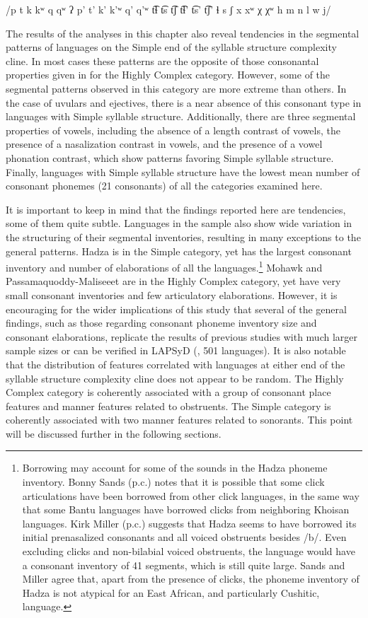 /p t k kʷ q qʷ ʔ p’ t’ k’ k’ʷ q’ q’ʷ t͡ɬ t͡s t͡ʃ t͡ɬ’ t͡s’ t͡ʃ’ ɬ s ʃ x xʷ χ χʷ h m n l w j/
\z

  The results of the analyses in this chapter also reveal tendencies in the segmental patterns of languages on the Simple end of the syllable structure complexity cline. In most cases these patterns are the opposite of those consonantal properties given in  for the Highly Complex category. However, some of the segmental patterns observed in this category are more extreme than others. In the case of uvulars and ejectives, there is a near absence of this consonant type in languages with Simple syllable structure. Additionally, there are three segmental properties of vowels, including the absence of a length contrast of vowels, the presence of a nasalization contrast in vowels, and the presence of a vowel phonation contrast, which show patterns favoring Simple syllable structure. Finally, languages with Simple syllable structure have the lowest mean number of consonant phonemes (21 consonants) of all the categories examined here.

  It is important to keep in mind that the findings reported here are tendencies, some of them quite subtle. Languages in the sample also show wide variation in the structuring of their segmental inventories, resulting in many exceptions to the general patterns. Hadza is in the Simple category, yet has the largest consonant inventory and number of elaborations of all the languages.\footnote{{Borrowing may account for some of the sounds in the Hadza phoneme inventory. Bonny Sands (p.c.) notes that it is possible that some click articulations have been borrowed from other click languages, in the same way that some Bantu languages have borrowed clicks from neighboring Khoisan languages. Kirk Miller (p.c.) suggests that Hadza seems to have borrowed its initial prenasalized consonants and all voiced obstruents besides /b/. Even excluding clicks and non-bilabial voiced obstruents, the language would have a consonant inventory of 41 segments, which is still quite large. Sands and Miller agree that, apart from the presence of clicks, the phoneme inventory of Hadza is not atypical for an East African, and particularly Cushitic, language.}} Mohawk and Passamaquoddy-Maliseeet are in the Highly Complex category, yet have very small consonant inventories and few articulatory elaborations. However, it is encouraging for the wider implications of this study that several of the general findings, such as those regarding consonant phoneme inventory size and consonant elaborations, replicate the results of previous studies with much larger sample sizes or can be verified in LAPSyD (\citealt{MaddiesonEtAl2013}, 501 languages). It is also notable that the distribution of features correlated with languages at either end of the syllable structure complexity cline does not appear to be random. The Highly Complex category is coherently associated with a group of consonant place features and manner features related to obstruents. The Simple category is coherently associated with two manner features related to sonorants. This point will be discussed further in the following sections.

